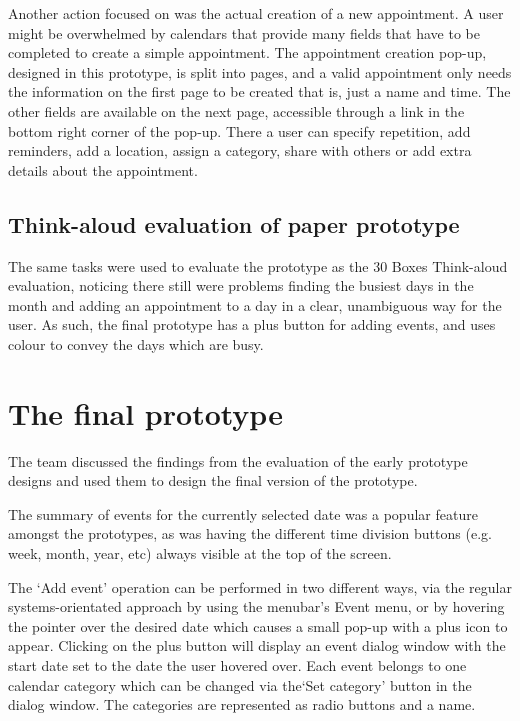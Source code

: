 \documentclass{article}
\begin{document}
Another action focused on was the actual creation of a new
appointment. A user might be overwhelmed by calendars that provide many
fields that have to be completed to create a simple appointment.
The appointment creation pop-up, designed in this prototype, is split
into pages, and a valid appointment only needs the information on the
first page to be created that is, just a name and time. The other
fields are available on the next page, accessible through a link in the
bottom right corner of the pop-up. There a user can specify repetition,
add reminders, add a location, assign a category, share with others or
add extra details about the appointment.

\subsection{Think-aloud evaluation of paper prototype}

The same tasks were used to evaluate the prototype as the 30 Boxes
Think-aloud evaluation, noticing there still were problems finding the
busiest days in the month and adding an appointment to a day in a
clear, unambiguous way for the user. As such, the final prototype has a
plus button for adding events, and uses colour to convey the days which
are busy.


\section{The final prototype}

The team discussed the findings from the evaluation of the early
prototype designs and used them to design the final version of the
prototype.

The summary of events for the currently selected date was a popular
feature amongst the prototypes, as was having the different time
division buttons (e.g. week, month, year, etc) always visible at the
top of the screen.

The `Add event' operation can be performed in two different ways, via
the regular systems-orientated approach by using the menubar's Event
menu, or by hovering the pointer over the desired date which causes a
small pop-up with a plus icon to appear. Clicking on the plus button
will display an event dialog window with the start date set to the
date the user hovered over. Each event belongs to one calendar category
which can be changed via the`Set category' button in the dialog window.
The categories are represented as radio buttons and a name.
\end{document}
